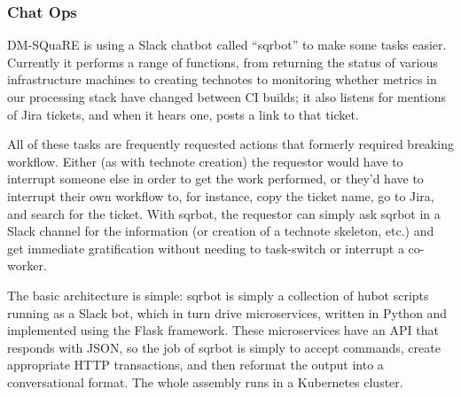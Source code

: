 \subsubsection{Chat Ops}
\label{sec:chatops}

DM-SQuaRE is using a Slack chatbot called ``sqrbot'' to make some tasks
easier. Currently it performs a range of functions, from returning the
status of various infrastructure machines to creating technotes to
monitoring whether metrics in our processing stack have changed between
CI builds; it also listens for mentions of Jira tickets, and when it
hears one, posts a link to that ticket.

All of these tasks are frequently requested actions that formerly
required breaking workflow.  Either (as with technote creation) the
requestor would have to interrupt someone else in order to get the work
performed, or they'd have to interrupt their own workflow to, for
instance, copy the ticket name, go to Jira, and search for the ticket.
With sqrbot, the requestor can simply ask sqrbot in a Slack channel for
the information (or creation of a technote skeleton, etc.) and get
immediate gratification without needing to task-switch or interrupt
a co-worker.

The basic architecture is simple: sqrbot is simply a collection of hubot
scripts running as a Slack bot, which in turn drive microservices,
written in Python and implemented using the Flask framework.  These
microservices have an API that responds with JSON, so the job of sqrbot
is simply to accept commands, create appropriate HTTP transactions, and
then reformat the output into a conversational format.  The whole
assembly runs in a Kubernetes cluster.
